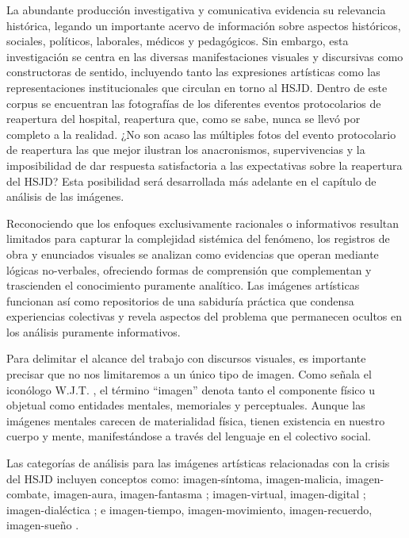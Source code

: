 La abundante producción investigativa y comunicativa evidencia su relevancia histórica, legando un importante acervo de información sobre aspectos históricos, sociales, políticos, laborales, médicos y pedagógicos. Sin embargo, esta investigación se centra en las diversas manifestaciones visuales y discursivas como constructoras de sentido, incluyendo tanto las expresiones artísticas como las representaciones institucionales que circulan en torno al HSJD. Dentro de este corpus se encuentran las fotografías de los diferentes eventos protocolarios de reapertura del hospital, reapertura que, como se sabe, nunca se llevó por completo a la realidad. ¿No son acaso las múltiples fotos del evento protocolario de reapertura las que mejor ilustran los anacronismos, supervivencias y la imposibilidad de dar respuesta satisfactoria a las expectativas sobre la reapertura del HSJD? Esta posibilidad será desarrollada más adelante en el capítulo de análisis de las imágenes.

Reconociendo que los enfoques exclusivamente racionales o informativos resultan limitados para capturar la complejidad sistémica del fenómeno, los registros de obra y enunciados visuales se analizan como evidencias que operan mediante lógicas no-verbales, ofreciendo formas de comprensión que complementan y trascienden el conocimiento puramente analítico. Las imágenes artísticas funcionan así como repositorios de una sabiduría práctica que condensa experiencias colectivas y revela aspectos del problema que permanecen ocultos en los análisis puramente informativos. 

Para delimitar el alcance del trabajo con discursos visuales, es importante precisar que no nos limitaremos a un único tipo de imagen. Como señala el iconólogo W.J.T. \parencite{Mitchell2005}, el término ``imagen'' denota tanto el componente físico u objetual como entidades mentales, memoriales y perceptuales. Aunque las imágenes mentales carecen de materialidad física, tienen existencia en nuestro cuerpo y mente, manifestándose a través del lenguaje en el colectivo social.

Las categorías de análisis para las imágenes artísticas relacionadas con la crisis del HSJD incluyen conceptos como: imagen-síntoma, imagen-malicia, imagen-combate, imagen-aura, imagen-fantasma \parencite{DidiHuberman2011}; imagen-virtual, imagen-digital \parencite{Manovich2005}; imagen-dialéctica \parencite{Benjamin2004}; e imagen-tiempo, imagen-movimiento, imagen-recuerdo, imagen-sueño \parencite{Deleuze1985}.

